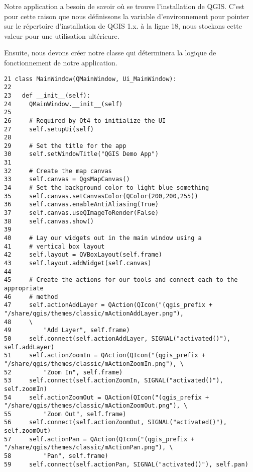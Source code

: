 Notre application a besoin de savoir où se trouve l'installation de QGIS. C'est pour cette raison que nous définissons la variable d'environnement  pour pointer sur le répertoire d'installation de QGIS 1.x. à la ligne 18, nous stockons cette valeur pour une utilisation ultérieure.

Ensuite, nous devons créer notre classe  qui déterminera la logique de fonctionnement de notre application.
\begin{verbatim}
21 class MainWindow(QMainWindow, Ui_MainWindow):
22 
23   def __init__(self):
24     QMainWindow.__init__(self)
25 
26     # Required by Qt4 to initialize the UI
27     self.setupUi(self)
28 
29     # Set the title for the app
30     self.setWindowTitle("QGIS Demo App")
31 
32     # Create the map canvas
33     self.canvas = QgsMapCanvas()
34     # Set the background color to light blue something
35     self.canvas.setCanvasColor(QColor(200,200,255))
36     self.canvas.enableAntiAliasing(True)
37     self.canvas.useQImageToRender(False)
38     self.canvas.show()
39 
40     # Lay our widgets out in the main window using a 
41     # vertical box layout
42     self.layout = QVBoxLayout(self.frame)
43     self.layout.addWidget(self.canvas)
44 
45     # Create the actions for our tools and connect each to the appropriate
46     # method
47     self.actionAddLayer = QAction(QIcon("(qgis_prefix + "/share/qgis/themes/classic/mActionAddLayer.png"),
48     \
49         "Add Layer", self.frame)
50     self.connect(self.actionAddLayer, SIGNAL("activated()"), self.addLayer)
51     self.actionZoomIn = QAction(QIcon("(qgis_prefix + "/share/qgis/themes/classic/mActionZoomIn.png"), \
52         "Zoom In", self.frame)
53     self.connect(self.actionZoomIn, SIGNAL("activated()"), self.zoomIn)
54     self.actionZoomOut = QAction(QIcon("(qgis_prefix + "/share/qgis/themes/classic/mActionZoomOut.png"), \
55         "Zoom Out", self.frame)
56     self.connect(self.actionZoomOut, SIGNAL("activated()"), self.zoomOut)
57     self.actionPan = QAction(QIcon("(qgis_prefix + "/share/qgis/themes/classic/mActionPan.png"), \
58         "Pan", self.frame)
59     self.connect(self.actionPan, SIGNAL("activated()"), self.pan)

\end{verbatim}
